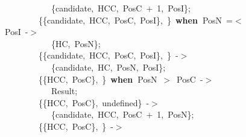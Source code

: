 \documentclass[runningheads,a4paper]{llncs}
\newcommand{\hlstd}[1]{\textcolor[rgb]{0,0,0}{#1}}
\newcommand{\hlnum}[1]{\textcolor[rgb]{0.69,0.49,0}{#1}}
\newcommand{\hlopt}[1]{\textcolor[rgb]{0,0,0}{#1}}
\newcommand{\hlkwa}[1]{\textcolor[rgb]{0,0,0}{\bf{#1}}}
\begin{document}
\begin{figure}
\hlstd{}\hlstd{\ \ \ \ \ \ \ \ \ \ \ \ }\hlstd{}\hlopt{\{}\hlstd{candidate}\hlopt{,\ }\hlstd{HCC}\hlopt{,\ }\hlstd{PosC\ }\hlopt{+\ }\hlstd{}\hlnum{1}\hlstd{}\hlopt{,\ }\hlstd{PosI}\hlopt{\};}\hspace*{\fill}\\
\hlstd{}\hlstd{\ \ \ \ \ \ \ \ \ }\hlstd{}\hlopt{\{\{}\hlstd{candidate}\hlopt{,\ }\hlstd{\textunderscore HCC}\hlopt{,\ }\hlstd{\textunderscore PosC}\hlopt{,\ }\hlstd{PosI}\hlopt{\},\ }\hlstd{\textunderscore }\hlopt{\}\ }\hlstd{}\hlkwa{when\ }\hlstd{PosN\ }\hlopt{=$<$\ }\hlstd{PosI\ }\hlopt{{-}$>$}\hspace*{\fill}\\
\hlstd{}\hlstd{\ \ \ \ \ \ \ \ \ \ \ \ }\hlstd{}\hlopt{\{}\hlstd{HC}\hlopt{,\ }\hlstd{PosN}\hlopt{\};}\hspace*{\fill}\\
\hlstd{}\hlstd{\ \ \ \ \ \ \ \ \ }\hlstd{}\hlopt{\{\{}\hlstd{candidate}\hlopt{,\ }\hlstd{\textunderscore HCC}\hlopt{,\ }\hlstd{\textunderscore PosC}\hlopt{,\ }\hlstd{PosI}\hlopt{\},\ }\hlstd{\textunderscore }\hlopt{\}\ {-}$>$}\hspace*{\fill}\\
\hlstd{}\hlstd{\ \ \ \ \ \ \ \ \ \ \ \ }\hlstd{}\hlopt{\{}\hlstd{candidate}\hlopt{,\ }\hlstd{HC}\hlopt{,\ }\hlstd{PosN}\hlopt{,\ }\hlstd{PosI}\hlopt{\};}\hspace*{\fill}\\
\hlstd{}\hlstd{\ \ \ \ \ \ \ \ \ }\hlstd{}\hlopt{\{\{}\hlstd{\textunderscore HCC}\hlopt{,\ }\hlstd{PosC}\hlopt{\},\ }\hlstd{\textunderscore }\hlopt{\}\ }\hlstd{}\hlkwa{when\ }\hlstd{PosN\ }\hlopt{$>$\ }\hlstd{PosC\ }\hlopt{{-}$>$}\hspace*{\fill}\\
\hlstd{}\hlstd{\ \ \ \ \ \ \ \ \ \ \ \ }\hlstd{Result}\hlopt{;}\hspace*{\fill}\\
\hlstd{}\hlstd{\ \ \ \ \ \ \ \ \ }\hlstd{}\hlopt{\{\{}\hlstd{HCC}\hlopt{,\ }\hlstd{PosC}\hlopt{\},\ }\hlstd{undefined}\hlopt{\}\ {-}$>$}\hspace*{\fill}\\
\hlstd{}\hlstd{\ \ \ \ \ \ \ \ \ \ \ \ }\hlstd{}\hlopt{\{}\hlstd{candidate}\hlopt{,\ }\hlstd{HCC}\hlopt{,\ }\hlstd{PosC\ }\hlopt{+\ }\hlstd{}\hlnum{1}\hlstd{}\hlopt{,\ }\hlstd{PosN}\hlopt{\};}\hspace*{\fill}\\
\hlstd{}\hlstd{\ \ \ \ \ \ \ \ \ }\hlstd{}\hlopt{\{\{}\hlstd{\textunderscore HCC}\hlopt{,\ }\hlstd{\textunderscore PosC}\hlopt{\},\ }\hlstd{\textunderscore }\hlopt{\}\ {-}$>$}\hspace*{\fill}\\

\end{figure}
\end{document}
